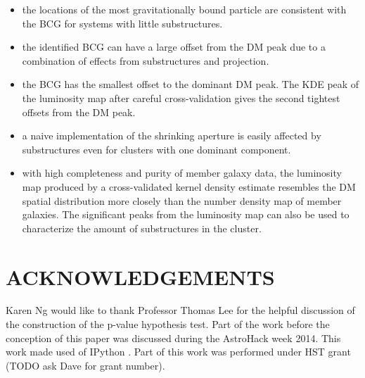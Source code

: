 \begin{itemize}
		\item the locations of the most gravitationally bound particle are consistent 
			with the BCG for systems with little substructures.  \\

		\item the identified BCG can have a large offset from the DM peak due to a
			combination of effects from substructures and projection. \\

		\item the BCG has the smallest offset to the dominant DM peak.  
			The KDE peak of the luminosity map after careful cross-validation 
			gives the second tightest offsets from the DM peak.  \\
		
		\item a naive implementation of the shrinking aperture is easily affected 
			by substructures even for clusters with one
			dominant component. \\  

		\item with high completeness and purity of member galaxy data, the
			luminosity map produced by a cross-validated kernel density estimate 
			resembles the DM spatial distribution more closely than 
			the number density map of member galaxies. The significant peaks from the 
			luminosity map can also be used to characterize the amount of substructures in
			the cluster.\\ 

	
\end{itemize}


\section{ACKNOWLEDGEMENTS}
Karen Ng would like to thank Professor Thomas Lee for the helpful discussion of 
the construction of the p-value hypothesis test. 
Part of the work before the conception of this paper was discussed during 
the AstroHack week 2014. This work made used of {\sc IPython}
\citep{Perez2007}.
Part of this work was performed under HST grant (TODO ask Dave for grant
number). 
% 
% 
% 
% 
% 
% 
% 

